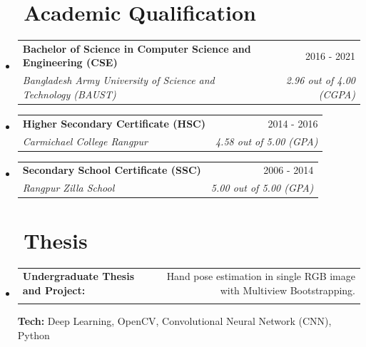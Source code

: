 \documentclass[a4paper,20pt]{article}
\makeatletter
\newcommand{\resumeItem}[2]{
  \item\small{
    \textbf{#1}{: #2 \vspace{-2pt}}
  }
}
\newcommand{\resumeSubheading}[4]{
  \vspace{-1pt}\item
    \begin{tabular*}{0.97\textwidth}{l@{\extracolsep{\fill}}r}
      \textbf{#1} & #2 \\
      \textit{#3} & \textit{#4} \\
    \end{tabular*}\vspace{-5pt}
}
\newcommand{\resumeSubItem}[2]{\resumeItem{#1}{#2}\vspace{-3pt}}
\newcommand{\resumeSubHeadingListStart}{\begin{itemize}[leftmargin=*]}
\newcommand{\resumeSubHeadingListEnd}{\end{itemize}}
\makeatother
\begin{document}
\section{~~Academic Qualification}

  \resumeSubHeadingListStart
    \resumeSubheading
      {Bachelor of Science in Computer Science and Engineering (CSE) }{2016 - 2021}
      {Bangladesh Army University of Science and Technology (BAUST)}{2.96 out of 4.00 (CGPA)}
      
      \vspace{5pt}
    
    \resumeSubheading
      {Higher Secondary Certificate (HSC)}{2014 - 2016}
      {Carmichael College Rangpur}{4.58 out of 5.00 (GPA)}
      
      \vspace{5pt}

    \resumeSubheading
      {Secondary School Certificate (SSC)}{2006 - 2014}
      {Rangpur Zilla School}{5.00 out of 5.00 (GPA)}
    \resumeSubHeadingListEnd


\vspace{5pt}


\section{~~Thesis}
  \resumeSubHeadingListStart
    \resumeSubheading
      {Undergraduate Thesis and Project:}{Hand pose estimation in single RGB image with Multiview Bootstrapping.}
      \break{} 
      \textbf{Tech:}{ Deep Learning, OpenCV, Convolutional Neural Network (CNN), Python}
    \resumeSubHeadingListEnd
    
\vspace{5pt}

\end{document}

